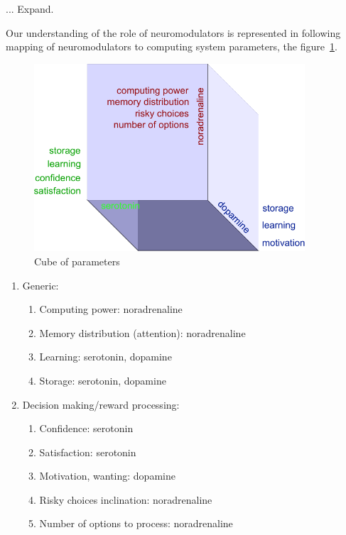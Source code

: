 ... Expand.

Our understanding of the role of neuromodulators \cite{cubeofemotions, emotionsbraintorobot} is represented in following mapping of neuromodulators to computing system parameters, the figure~\ref{cube_of_parameters}.

\begin{figure}
\begin{center}
 \includegraphics[height=7cm]{figure3_cube_of_parameters}
\end{center}
\caption{Cube of parameters}
\label{cube_of_parameters}
\end{figure}

\begin{enumerate}
 \item  Generic:
 \begin{enumerate}
  \item  Computing power: noradrenaline
  \item  Memory distribution (attention): noradrenaline
  \item  Learning: serotonin, dopamine
  \item  Storage: serotonin, dopamine
 \end{enumerate}
 \item  Decision making/reward processing:
 \begin{enumerate}
  \item  Confidence: serotonin
  \item  Satisfaction: serotonin
  \item  Motivation, wanting: dopamine
  \item  Risky choices inclination: noradrenaline
  \item  Number of options to process: noradrenaline
 \end{enumerate}
\end{enumerate}

